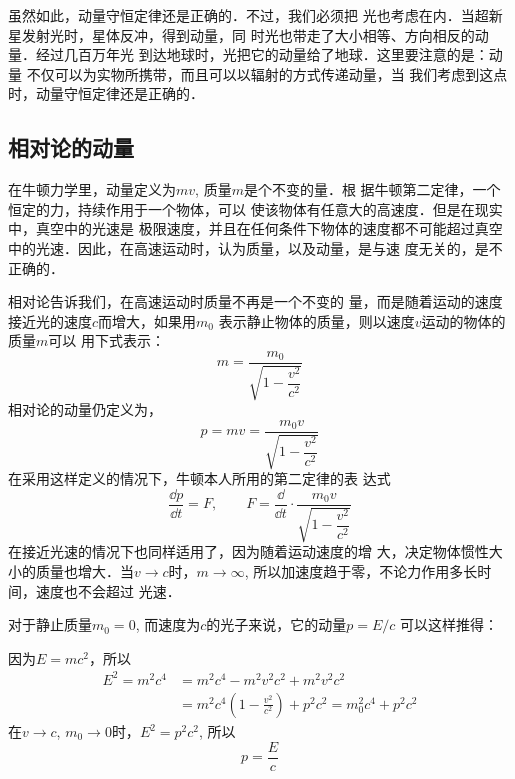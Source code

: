 虽然如此，动量守恒定律还是正确的．不过，我们必须把
光也考虑在内．当超新星发射光时，星体反冲，得到动量，同
时光也带走了大小相等、方向相反的动量．经过几百万年光
到达地球时，光把它的动量给了地球．这里要注意的是：动量
不仅可以为实物所携带，而且可以以辐射的方式传递动量，当
我们考虑到这点时，动量守恒定律还是正确的．

\subsection{相对论的动量}

在牛顿力学里，动量定义为$mv$, 质量$m$是个不变的量．根
据牛顿第二定律，一个恒定的力，持续作用于一个物体，可以
使该物体有任意大的高速度．但是在现实中，真空中的光速是
极限速度，并且在任何条件下物体的速度都不可能超过真空
中的光速．因此，在高速运动时，认为质量，以及动量，是与速
度无关的，是不正确的．

相对论告诉我们，在高速运动时质量不再是一个不变的
量，而是随着运动的速度接近光的速度$c$而增大，如果用$m_0$
表示静止物体的质量，则以速度$v$运动的物体的质量$m$可以
用下式表示：
\[m=\frac{m_0}{\sqrt{1-\dfrac{v^2}{c^2}}}\]
相对论的动量仍定义为，
\[p=mv=\frac{m_0v}{\sqrt{1-\dfrac{v^2}{c^2}}}\]
在采用这样定义的情况下，牛顿本人所用的第二定律的表
达式
\[\frac{\dd p}{\dd t}=F,\qquad F=\frac{\dd}{\dd t}\cdot\frac{m_0v}{\sqrt{1-\dfrac{v^2}{c^2}}}\]
在接近光速的情况下也同样适用了，因为随着运动速度的增
大，决定物体惯性大小的质量也增大．当$v\to c$时，$m\to \infty$, 所以加速度趋于零，不论力作用多长时间，速度也不会超过
光速．

对于静止质量$m_0=0$, 而速度为$c$的光子来说，它的动量$p=E/c$
可以这样推得：

因为$E=mc^2$，所以
\[\begin{split}
    E^2=m^2c^4&=m^2c^4-m^2v^2c^2+m^2v^2c^2\\
    &=m^2c^4\left(1-\frac{v^2}{c^2}\right)+p^2c^2=m^2_0c^4+p^2c^2
\end{split}\]
在$v\to c$, $m_0\to 0$时，$E^2=p^2c^2$, 所以
\[p=\frac{E}{c}\]


